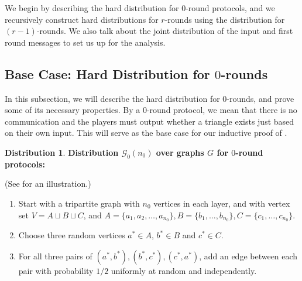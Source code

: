\documentclass[11pt]{article}
\theoremstyle{definition}
\newtheorem{mddistribution}{Distribution}
\newenvironment{Distribution}{\begin{tbox}\begin{mddistribution}}{\end{mddistribution}\end{tbox}}
\newenvironment{tbox}{\begin{tcolorbox}[
		enlarge top by=5pt,
		enlarge bottom by=5pt,
		 breakable,
		 boxsep=0pt,
                  left=4pt,
                  right=4pt,
                  top=10pt,
                  arc=4pt,
                  boxrule=1pt,toprule=1pt,
                  colback=white
                  ]%
	}
{\end{tcolorbox}}
\newcommand{\astar}{\ensuremath{a^*}}
\newcommand{\bstar}{\ensuremath{b^*}}
\newcommand{\cstar}{\ensuremath{c^*}}
\newcommand{\cG}{\ensuremath{\mathcal{G}}}
\begin{document}
We begin by describing the hard distribution for $0$-round protocols, and we recursively construct hard distributions for $r$-rounds using the distribution for $(r-1)$-rounds. We also talk about the joint distribution of the input and first round messages to set us up for the analysis. 

\subsection{Base Case: Hard Distribution for $0$-rounds}
In this subsection, we will describe the hard distribution for $0$-rounds, and prove some of its necessary properties. 
By a $0$-round protocol, we mean that there is no communication and the players must output whether a triangle exists just based on their own input. This will serve as the base case for our inductive proof of . 
\begin{Distribution}\label{dist:0}
	\textbf{Distribution $\cG_0(n_0)$ over graphs $G$ for $0$-round protocols:} 
	
	(See  for an illustration.)
	\begin{enumerate}[label=$(\arabic*)$]
		\item Start with a tripartite graph with $n_0$ vertices in each layer, and with vertex set $V = A \sqcup B \sqcup C$, and $A = \{a_1, a_2, \ldots, a_{n_0}\}, B = \{b_1, \ldots, b_{n_0}\}, C = \{c_1, \ldots, c_{n_0}\}$. 
		\item Choose three random vertices $\astar \in A$, $\bstar \in B$ and $\cstar \in C$. 
		\item For all three pairs of $(\astar,\bstar), (\bstar,\cstar), (\cstar,\astar)$, add an edge between each pair with probability $1/2$ uniformly at random and independently. 
	\end{enumerate}
\end{Distribution}
\end{document}
